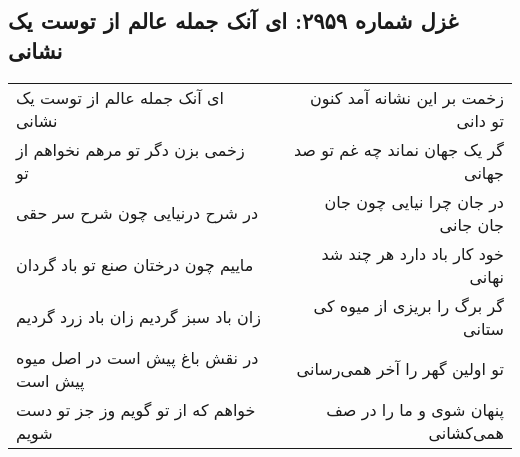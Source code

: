 \begin{center}
\section*{غزل شماره ۲۹۵۹: ای آنک جمله عالم از توست یک نشانی}
\label{sec:2959}
\begin{longtable}{l p{0.5cm} r}
ای آنک جمله عالم از توست یک نشانی
&&
زخمت بر این نشانه آمد کنون تو دانی
\\
زخمی بزن دگر تو مرهم نخواهم از تو
&&
گر یک جهان نماند چه غم تو صد جهانی
\\
در شرح درنیایی چون شرح سر حقی
&&
در جان چرا نیایی چون جان جان جانی
\\
ماییم چون درختان صنع تو باد گردان
&&
خود کار باد دارد هر چند شد نهانی
\\
زان باد سبز گردیم زان باد زرد گردیم
&&
گر برگ را بریزی از میوه کی ستانی
\\
در نقش باغ پیش است در اصل میوه پیش است
&&
تو اولین گهر را آخر همی‌رسانی
\\
خواهم که از تو گویم وز جز تو دست شویم
&&
پنهان شوی و ما را در صف همی‌کشانی
\\
\end{longtable}
\end{center}
